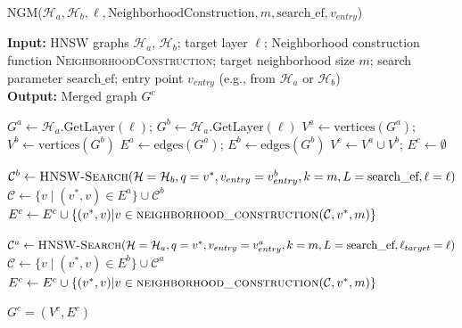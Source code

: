 \documentclass{article}
\begin{document}
\begin{algorithm}
\caption{\textsc{NGM}($\mathcal{H}_a, \mathcal{H}_b, \ell, \text{NeighborhoodConstruction}, m, \text{search\_ef}, v_{entry}$)}\label{alg:merge_naive}
\textbf{Input:} HNSW graphs $\mathcal{H}_a$, $\mathcal{H}_b$; target layer $\ell$; Neighborhood construction function \textsc{NeighborhoodConstruction}; target neighborhood size $m$; search parameter $\text{search\_ef}$; entry point $v_{entry}$ (e.g., from $\mathcal{H}_a$ or $\mathcal{H}_b$) \\
\textbf{Output:} Merged graph $G^c$
\begin{algorithmic}[1]
\State $G^a \gets \mathcal{H}_a\text{.GetLayer}(\ell) $; $G^b \gets\mathcal{H}_a\text{.GetLayer}(\ell)$ 
\State $V^a \gets \text{vertices}(G^a)$; $V^b \gets \text{vertices}(G^b)$
\State $E^a \gets \text{edges}(G^a)$; $E^b \gets \text{edges}(G^b)$
\State $V^c \gets V^a \cup V^b$; $E^c \gets \emptyset$ 

    \State $\mathcal{C}^b \gets \textsc{HNSW-Search}(\mathcal{H}=\mathcal{H}_b, q=v^*, v_{entry}=v_{entry}^b, k=m, L=\text{search\_ef}, \ell=\ell)$ 
    \State $\mathcal{C} \gets \{v \mid (v^*, v) \in E^a \} \cup \mathcal{C}^b$  
    \State $E^c \gets E^c \cup \{(v^*, v) | v \in \textsc{neighborhood\_construction}(\mathcal{C}, v^*, m)\}$
\EndFor

    \State $\mathcal{C}^a \gets \textsc{HNSW-Search}(\mathcal{H}=\mathcal{H}_a, q=v^*, v_{entry}=v_{entry}^a, k=m, L=\text{search\_ef}, \ell_{target}=\ell)$ 
    \State $\mathcal{C} \gets \{v \mid (v^*, v) \in E^b \} \cup \mathcal{C}^a$  
    \State $E^c \gets E^c \cup \{(v^*, v) | v \in \textsc{neighborhood\_construction}(\mathcal{C}, v^*, m)\}$
\EndFor

\State \Return $G^c = (V^c, E^c)$
\end{algorithmic}
\end{algorithm}
\end{document}
